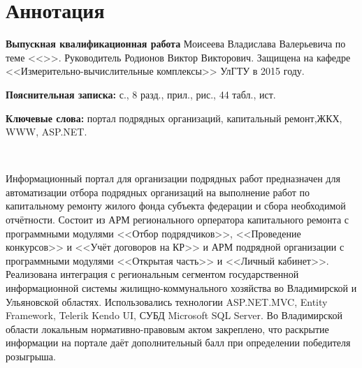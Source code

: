 
\section*{Аннотация}

\textbf{Выпускная квалификационная работа} Моисеева Владислава Валерьевича по теме <<\WorkName>>.
Руководитель Родионов Виктор Викторович.
Защищена на кафедре <<Измерительно-вычислительные комплексы>> УлГТУ в 2015 году.

\textbf{Пояснительная записка:}  с., 8 разд.,  прил.,  рис., 44 табл.,  ист.

\textbf{Ключевые слова:} портал подрядных организаций, капитальный ремонт,\linebreak ЖКХ, WWW, ASP.NET. 

~

Информационный портал для организации подрядных работ предназначен для автоматизации отбора подрядных организаций на выполнение работ по капитальному ремонту жилого фонда субъекта федерации и сбора необходимой отчётности.
Состоит из АРМ регионального орператора капитального ремонта с программными модулями <<Отбор подрядчиков>>, <<Проведение конкурсов>> и <<Учёт договоров на КР>> и АРМ подрядной организации с программными модулями <<Открытая часть>> и <<Личный кабинет>>.
Реализована интеграция с региональным сегментом государственной информационной системы жилищно-коммунального хозяйства во Владимирской и Ульяновской областях.
Использовались технологии \linebreak ASP.NET.MVC, Entity Framework, Telerik Kendo UI, СУБД Microsoft SQL Server.
Во Владимирской области локальным нормативно-правовым актом закреплено, что раскрытие информации на портале даёт дополнительный балл при определении победителя розыгрыша. 

\clearpage
\newpage
